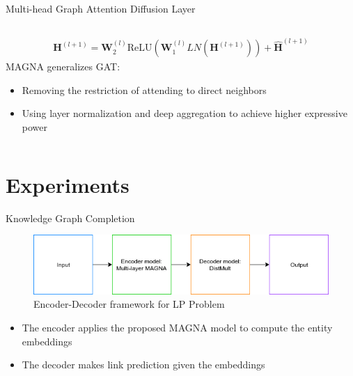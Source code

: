 \documentclass[notheorems, aspectratio=149]{beamer}
\begin{document}
\begin{frame}{Multi-head Graph Attention Diffusion Layer}
\begin{columns}
\begin{column}{0.6\textwidth}
\begin{gather*}
						\mathbf{H}^{(l+1)} = \mathbf{W}_2^{(l)}\text{ReLU}(\mathbf{W}_1^{(l)}LN(\mathbf{H}^{(l+1)})) + \hat{\mathbf{H}}^{(l+1)}
					\end{gather*}
					MAGNA generalizes GAT:
					\begin{itemize}
						\item Removing the restriction of attending to direct neighbors
						\item Using layer normalization and deep aggregation to achieve
						higher expressive power
					\end{itemize}
				\end{column}
			\end{columns}
		\end{frame}
		\section{Experiments}
		\begin{frame}{Knowledge Graph Completion}
			\begin{figure}[H]
				\centering
				\includegraphics[width=1\linewidth]{figs/kgc.png}
				\caption{Encoder-Decoder framework for LP Problem}
				\label{fig:writing-thesis}
			\end{figure}
			\begin{itemize}
				\item The encoder applies the proposed MAGNA model to compute the entity embeddings
				\item The decoder makes link prediction given the embeddings
			\end{itemize}
		\end{frame}
\end{document}
